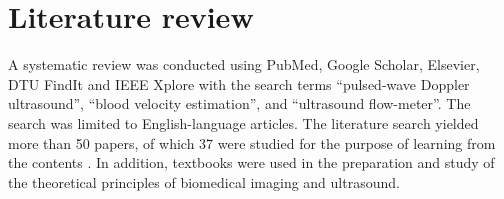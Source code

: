 \section{Literature review}

A systematic review was conducted using PubMed, Google Scholar, Elsevier, DTU FindIt and IEEE Xplore with the search terms \enquote{pulsed-wave Doppler ultrasound}, \enquote{blood velocity estimation}, and \enquote{ultrasound flow-meter}. The search was limited to English-language articles. The literature search yielded more than 50 papers, of which 37 were studied for the purpose of learning from the contents \cite{Satomura_CW,Baker1970,Shung1976,Schlindwein1988,Hall_Wall_Filter,Jensen_Analysis_PW_1996,Wells1998,PWDesignParameters,Jansson_Estimation_Perfusion,Hoskins_Review_Blood_Velocity,Fish_Ultrasonic,Jensen_Algorithms,cmut_array_shape,Williams2006,Tsang2009,Matsuoka_Doppler_Rabbit,Hoskins2010,PICpulser,Advances_BloodFlow_Velocity,Overview_Emerging_Imaging,Huang_Smartphone_2012,DesignDocument,Winckler2012,Sagdiev2014,Jacinta_string_phantom,500Vpulser,Wang2016,Govindan2016,Wang2019,JanaSmartphone2020,Ding_PW_Pmut,DingPMUTs,Winder2021,Omura2022,2023_review,Ricci2018,Bessi1995}. In addition, textbooks \cite{JensenUltrasoundBook,ShungUltrasound_Book,Szabo_UltrasoundBook_2} were used in the preparation and study of the theoretical principles of biomedical imaging and ultrasound.

